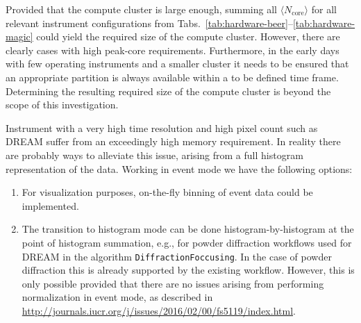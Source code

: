 \documentclass[a4paper,english,numbers=noenddot,bibliography=totoc,chapterprefix=on,DIV=12]{scrartcl}
\newcommand{\Ncoremean}{\langle N_{\text{core}}\rangle}
\newcommand{\dream}{DREAM\xspace}
\newcommand{\loki}{LoKI\xspace}
\newcommand{\magic}{MAGIC\xspace}
\begin{document}
\begin{table}
  \scriptsize
  
  \caption{\label{tab:hardware-loki}
Example estimate of hardware required for script-based reduction for \loki.
Peak as well as average core count requirements are low.
}
\end{table}

\begin{table}
  \footnotesize
  
  \caption{\label{tab:hardware-magic}
Example estimate of hardware required for script-based reduction for \magic.
The numbers given here are very high --- and most likely unrealistic --- due to a combination of a high pixel count and a low event count per sample rotation angle, with only $10^5$ to $5\times10^5$ events per rotation angle quoted by the instrument scientists.
Assuming that each rotation is treated independently results in the figures given here.
Probably this is not a good assumption and a joint treatment of sample rotation angles needs to be considered instead.
}
\end{table}

Provided that the compute cluster is large enough, summing all $\Ncoremean$ for all relevant instrument configurations from Tabs.~\ref{tab:hardware-beer}--\ref{tab:hardware-magic} could yield the required size of the compute cluster.
However, there are clearly cases with high peak-core requirements.
Furthermore, in the early days with few operating instruments and a smaller cluster it needs to be ensured that an appropriate partition is always available within a to be defined time frame.
Determining the resulting required size of the compute cluster is beyond the scope of this investigation.

Instrument with a very high time resolution and high pixel count such as \dream suffer from an exceedingly high memory requirement.
In reality there are probably ways to alleviate this issue, arising from a full histogram representation of the data.
Working in event mode we have the following options:
\begin{enumerate}
  \item For visualization purposes, on-the-fly binning of event data could be implemented.
  \item The transition to histogram mode can be done histogram-by-histogram at the point of histogram summation, e.g., for powder diffraction workflows used for \dream in the algorithm \verb|DiffractionFoccusing|.
    In the case of powder diffraction this is already supported by the existing workflow.
    However, this is only possible provided that there are no issues arising from performing normalization in event mode, as described in \url{http://journals.iucr.org/j/issues/2016/02/00/fs5119/index.html}.
\end{enumerate}
\end{document}
